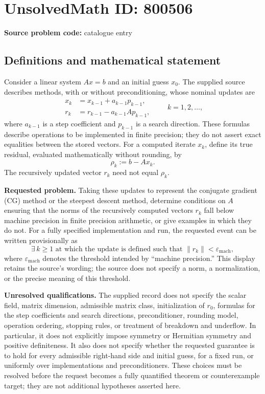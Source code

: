 \documentclass[11pt]{article}
\begin{document}
\section*{UnsolvedMath ID: 800506}
\textbf{Source problem code:} catalogue entry
\subsection{Definitions and mathematical statement}
Consider a linear system \(Ax=b\) and an initial guess \(x_0\). The supplied source describes methods, with or without preconditioning, whose nominal updates are
\[
\begin{aligned}
x_k &= x_{k-1}+a_{k-1}p_{k-1},\\
r_k &= r_{k-1}-a_{k-1}Ap_{k-1},
\end{aligned}
\qquad k=1,2,\ldots,
\]
where \(a_{k-1}\) is a step coefficient and \(p_{k-1}\) is a search direction. These formulas describe operations to be implemented in finite precision; they do not assert exact equalities between the stored vectors. For a computed iterate \(x_k\), define its true residual, evaluated mathematically without rounding, by
\[
\rho_k:=b-Ax_k.
\]
The recursively updated vector \(r_k\) need not equal \(\rho_k\).

\textbf{Requested problem.} Taking these updates to represent the conjugate gradient (CG) method or the steepest descent method, determine conditions on \(A\) ensuring that the norms of the recursively computed vectors \(r_k\) fall below machine precision in finite precision arithmetic, or give examples in which they do not. For a fully specified implementation and run, the requested event can be written provisionally as
\[
\exists\,k\geq 1\text{ at which the update is defined such that }
\|r_k\|<\varepsilon_{\mathrm{mach}},
\]
where \(\varepsilon_{\mathrm{mach}}\) denotes the threshold intended by ``machine precision.'' This display retains the source's wording; the source does not specify a norm, a normalization, or the precise meaning of this threshold.

\textbf{Unresolved qualifications.} The supplied record does not specify the scalar field, matrix dimension, admissible matrix class, initialization of \(r_0\), formulas for the step coefficients and search directions, preconditioner, rounding model, operation ordering, stopping rules, or treatment of breakdown and underflow. In particular, it does not explicitly impose symmetry or Hermitian symmetry and positive definiteness. It also does not specify whether the requested guarantee is to hold for every admissible right-hand side and initial guess, for a fixed run, or uniformly over implementations and preconditioners. These choices must be resolved before the request becomes a fully quantified theorem or counterexample target; they are not additional hypotheses asserted here.
\end{document}
